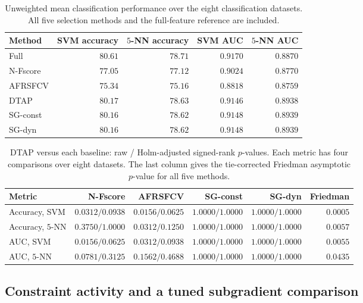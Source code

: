 \documentclass[]{interact}
\theoremstyle{plain}
\theoremstyle{definition}
\theoremstyle{remark}
\begin{document}
\begin{table}[htbp]
\centering\small\setlength{\tabcolsep}{4pt}
\caption{Unweighted mean classification performance over the eight classification datasets. All five selection methods and the full-feature reference are included.}\label{tab:perf-summary}
\begin{tabular}{lrrrr}
\toprule
Method & SVM accuracy & $5$-NN accuracy & SVM AUC & $5$-NN AUC \\
\midrule
Full & $80.61$ & $78.71$ & $0.9170$ & $0.8870$ \\
N-Fscore & $77.05$ & $77.12$ & $0.9024$ & $0.8770$ \\
AFRSFCV & $75.34$ & $75.16$ & $0.8818$ & $0.8759$ \\
DTAP & $80.17$ & $78.63$ & $0.9146$ & $0.8938$ \\
SG-const & $80.16$ & $78.62$ & $0.9148$ & $0.8939$ \\
SG-dyn & $80.16$ & $78.62$ & $0.9148$ & $0.8939$ \\
\bottomrule
\end{tabular}

\end{table}
\begin{table}[htbp]
\centering\footnotesize\setlength{\tabcolsep}{4pt}
\caption{DTAP versus each baseline: raw / Holm-adjusted signed-rank $p$-values. Each metric has four comparisons over eight datasets. The last column gives the tie-corrected Friedman asymptotic $p$-value for all five methods.}\label{tab:wilcoxon}
\begin{tabular}{lrrrrr}
\toprule
Metric & N-Fscore & AFRSFCV & SG-const & SG-dyn & Friedman \\
\midrule
Accuracy, SVM & $0.0312/0.0938$ & $0.0156/0.0625$ & $1.0000/1.0000$ & $1.0000/1.0000$ & $0.0005$ \\
Accuracy, $5$-NN & $0.3750/1.0000$ & $0.0312/0.1250$ & $1.0000/1.0000$ & $1.0000/1.0000$ & $0.0057$ \\
AUC, SVM & $0.0156/0.0625$ & $0.0312/0.0938$ & $1.0000/1.0000$ & $1.0000/1.0000$ & $0.0055$ \\
AUC, $5$-NN & $0.0781/0.3125$ & $0.1562/0.4688$ & $1.0000/1.0000$ & $1.0000/1.0000$ & $0.0435$ \\
\bottomrule
\end{tabular}

\end{table}

\subsection{Constraint activity and a tuned subgradient comparison}
\label{ssec:feasibility-audit}
\end{document}
